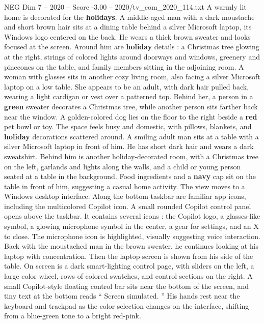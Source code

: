\begin{textsample}{NEG Dim 7 – 2020 – Score -3.00 – 2020/tv\_com\_2020\_114.txt}  \label{ex:f7_neg_017}
A warmly lit home is decorated for the \textbf{holidays}.
A middle-aged man with a dark moustache and short brown hair sits at a dining table behind a silver Microsoft laptop, its Windows logo centered on the back.
He wears a thick brown sweater and looks focused at the screen.
Around him are \textbf{holiday} details : a Christmas tree glowing at the right, strings of colored lights around doorways and windows, greenery and pinecones on the table, and family members sitting in the adjoining room.
A woman with glasses sits in another cozy living room, also facing a silver Microsoft laptop on a low table.
She appears to be an adult, with dark hair pulled back, wearing a light cardigan or vest over a patterned top.
Behind her, a person in a \textbf{green} sweater decorates a Christmas tree, while another person sits farther back near the window.
A golden-colored dog lies on the floor to the right beside a \textbf{red} pet bowl or toy.
The space feels busy and domestic, with pillows, blankets, and \textbf{holiday} decorations scattered around.
A smiling adult man sits at a table with a silver Microsoft laptop in front of him.
He has short dark hair and wears a dark sweatshirt.
Behind him is another holiday-decorated room, with a Christmas tree on the left, garlands and lights along the walls, and a child or young person seated at a table in the background.
Food ingredients and a \textbf{navy} cap sit on the table in front of him, suggesting a casual home activity.
The view moves to a Windows desktop interface.
Along the bottom taskbar are familiar app icons, including the multicolored Copilot icon.
A small rounded Copilot control panel opens above the taskbar.
It contains several icons : the Copilot logo, a glasses-like symbol, a glowing microphone symbol in the center, a gear for settings, and an X to close.
The microphone icon is highlighted, visually suggesting voice interaction.
Back with the moustached man in the brown sweater, he continues looking at his laptop with concentration.
Then the laptop screen is shown from his side of the table.
On screen is a dark smart-lighting control page, with sliders on the left, a large color wheel, rows of colored swatches, and control sections on the right.
A small Copilot-style floating control bar sits near the bottom of the screen, and tiny text at the bottom reads “ Screen simulated. ” His hands rest near the keyboard and trackpad as the color selection changes on the interface, shifting from a blue-green tone to a bright red-pink.

\end{textsample}
